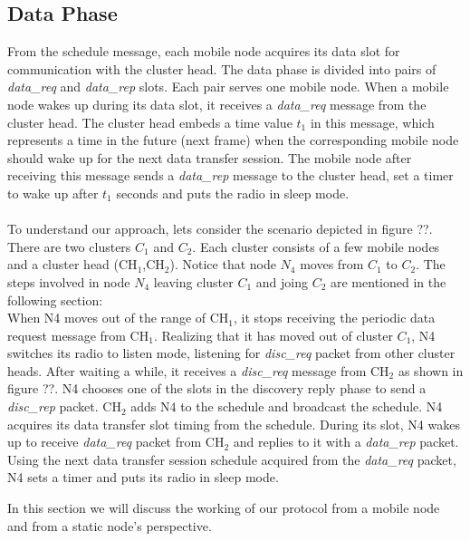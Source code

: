 \documentclass[a4paper, conference, 10pt]{IEEEtran}
\begin{document}
\subsection{Data Phase}
\label{data_phase}

From the schedule message, each mobile node acquires its data slot for communication with the cluster head. The data phase is divided into pairs of \emph{data\_req} and \emph{data\_rep} slots. Each pair serves one mobile node. When a mobile node wakes up during its data slot, it receives a \emph{data\_req} message from the cluster head. The cluster head embeds a time value \emph{$t_1$} in this message, which represents a time in the future (next frame) when the corresponding mobile node should wake up for the next data transfer session. The mobile node after receiving this message sends a \emph{data\_rep} message to the cluster head, set a timer to wake up after \emph{$t_1$} seconds and puts the radio in sleep mode. \\\\

To understand our approach, lets consider the scenario depicted in figure ??. There are two clusters $C_1$ and $C_2$. Each cluster consists of a few mobile nodes and a cluster head (CH$_1$,CH$_2$). Notice that node \emph{$N_4$} moves from $C_1$ to $C_2$. The steps involved in node $N_4$ leaving cluster $C_1$ and joing $C_2$ are mentioned in the following section: \\

When N4 moves out of the range of CH$_1$, it stops receiving the periodic data request message from CH$_1$. Realizing that it has moved out of cluster $C_1$, N4 switches its radio to listen mode, listening for \emph{disc\_req} packet from other cluster heads. After waiting a while, it receives a \emph{disc\_req} message from CH$_2$ as shown in figure ??. N4 chooses one of the slots in the discovery reply phase to send a \emph{disc\_rep} packet. CH$_2$ adds N4 to the schedule and broadcast the schedule. N4 acquires its data transfer slot timing from the schedule. During its slot, N4 wakes up to receive \emph{data\_req} packet from CH$_2$ and replies to it with a \emph{data\_rep} packet. Using the next data transfer session schedule acquired from the \emph{data\_req} packet, N4 sets a timer and puts its radio in sleep mode. 

\iffalse 
In this section we will discuss the working of our protocol from a mobile node and from a static node's perspective. 
\end{document}
